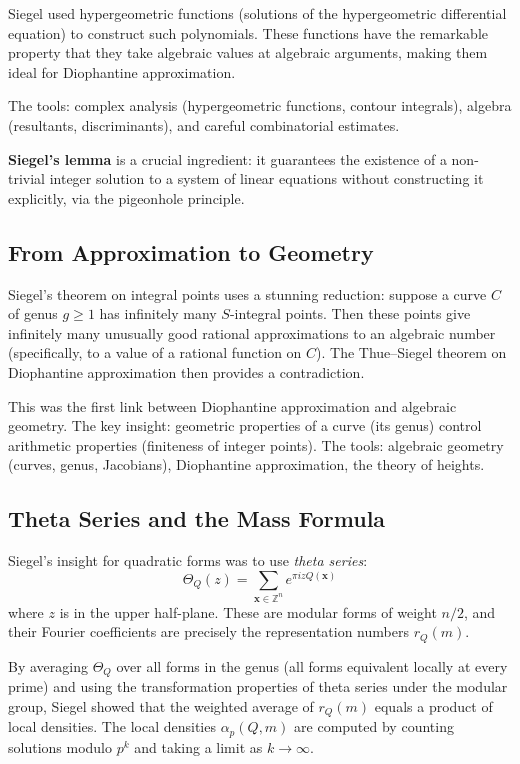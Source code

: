 Siegel used hypergeometric functions (solutions of the hypergeometric differential equation) to construct such polynomials. These functions have the remarkable property that they take algebraic values at algebraic arguments, making them ideal for Diophantine approximation.

The tools: complex analysis (hypergeometric functions, contour integrals), algebra (resultants, discriminants), and careful combinatorial estimates.

\textbf{Siegel's lemma} is a crucial ingredient: it guarantees the existence of a non-trivial integer solution to a system of linear equations without constructing it explicitly, via the pigeonhole principle.

\subsection{From Approximation to Geometry}

Siegel's theorem on integral points uses a stunning reduction: suppose a curve $C$ of genus $g \geq 1$ has infinitely many $S$-integral points. Then these points give infinitely many unusually good rational approximations to an algebraic number (specifically, to a value of a rational function on $C$). The Thue--Siegel theorem on Diophantine approximation then provides a contradiction.

This was the first link between Diophantine approximation and algebraic geometry. The key insight: geometric properties of a curve (its genus) control arithmetic properties (finiteness of integer points). The tools: algebraic geometry (curves, genus, Jacobians), Diophantine approximation, the theory of heights.

\subsection{Theta Series and the Mass Formula}

Siegel's insight for quadratic forms was to use \textit{theta series}:
\[
\Theta_Q(z) = \sum_{\mathbf{x} \in \mathbb{Z}^n} e^{\pi i z Q(\mathbf{x})}
\]
where $z$ is in the upper half-plane. These are modular forms of weight $n/2$, and their Fourier coefficients are precisely the representation numbers $r_Q(m)$.

By averaging $\Theta_Q$ over all forms in the genus (all forms equivalent locally at every prime) and using the transformation properties of theta series under the modular group, Siegel showed that the weighted average of $r_Q(m)$ equals a product of local densities. The local densities $\alpha_p(Q,m)$ are computed by counting solutions modulo $p^k$ and taking a limit as $k \to \infty$.

